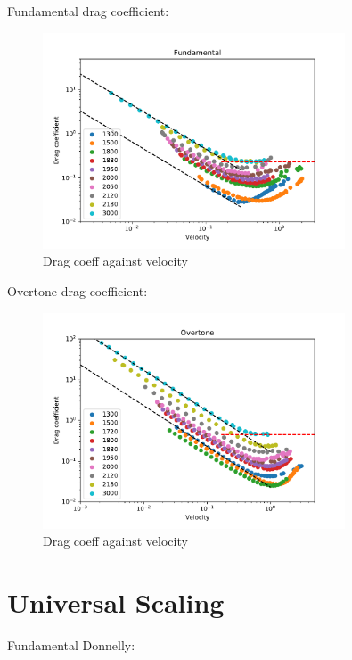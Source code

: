 Fundamental drag coefficient:

\begin{figure}[h]
	\centering
	\includegraphics[width=0.8\textwidth]{graphics/results/fund-coeff_vel}
	\caption{Drag coeff against velocity}
	\label{fund_drag_vel}
\end{figure}

Overtone drag coefficient:

\begin{figure}[h]
	\centering
	\includegraphics[width=0.8\textwidth]{graphics/results/over-coeff_vel}
	\caption{Drag coeff against velocity}
	\label{fund_drag_vel}
\end{figure}

\section{Universal Scaling}

Fundamental Donnelly:

